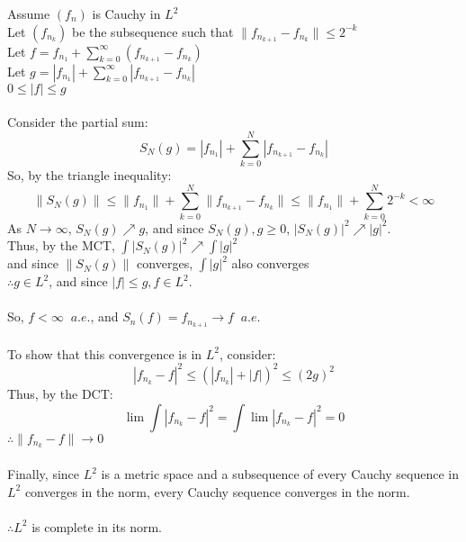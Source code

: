 \documentclass[letterpaper,12pt,fleqn]{article}
\newcommand{\abs}[1]{\left|#1\right|}
\newcommand{\norm}[1]{\lVert#1\rVert}
\begin{document}
\begin{theproof}
Assume $(f_n)$ is Cauchy in $L^2$ \\
Let $(f_{n_k})$ be the subsequence such that $\norm{f_{n_{k+1}}-f_{n_k}}\le2^{-k}$ \\
Let $f=f_{n_1}+\sum_{k=0}^{\infty}(f_{n_{k+1}}-f_{n_k})$ \\
Let $g=\abs{f_{n_1}}+\sum_{k=0}^{\infty}\abs{f_{n_{k+1}}-f_{n_k}}$ \\
$0\le\abs{f}\le g$ \\
\\
Consider the partial sum:
\[S_N(g)=\abs{f_{n_1}}+\sum_{k=0}^{N}\abs{f_{n_{k+1}}-f_{n_k}}\]
So, by the triangle inequality:
\[\norm{S_N(g)}\le\norm{f_{n_1}}+\sum_{k=0}^{N}\norm{f_{n_{k+1}}-f_{n_k}}
    \le\norm{f_{n_1}}+\sum_{k=0}^{N}2^{-k}<\infty\]
As $N\to\infty$, $S_{N}(g)\nearrow g$, and since $S_{N}(g),g\ge0$,
$\abs{S_{N}(g)}^2\nearrow\abs{g}^2$. \\
Thus, by the MCT, $\int\abs{S_{N}(g)}^2\nearrow\int\abs{g}^2$ \\
and since $\norm{S_N(g)}$ converges, $\int\abs{g}^2$ also converges \\
$\therefore g\in L^2$, and since $|f|\le g, f\in L^2$. \\
\\
So, $f<\infty\;\;a.e.$, and $S_n(f)=f_{n_{k+1}}\to f\;\;a.e.$ \\
\\
To show that this convergence is in $L^2$, consider:
\[\abs{f_{n_k}-f}^2\le(\abs{f_{n_k}}+\abs{f})^2\le(2g)^2\]
Thus, by the DCT:\\
\[\lim\int\abs{f_{n_k}-f}^2=\int\lim\abs{f_{n_k}-f}^2=0\]
$\therefore \norm{f_{n_k}-f}\to0$ \\
\\
Finally, since $L^2$ is a metric space and a subsequence of every Cauchy
sequence in $L^2$ converges in the norm, every Cauchy sequence converges in
the norm. \\
\\
$\therefore L^2$ is complete in its norm.
\end{theproof}
\end{document}
